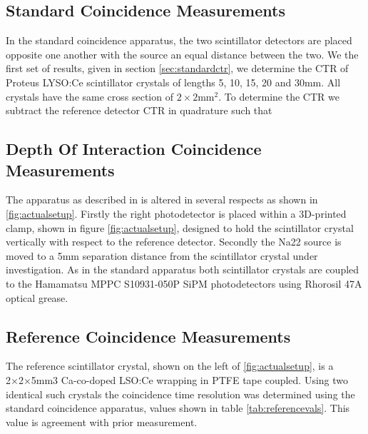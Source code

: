 \subsection{Standard Coincidence Measurements}
In the standard coincidence apparatus, the two scintillator detectors are placed opposite one another with the source an equal distance between the two. We the first set of results, given in section \ref{sec:standardctr}, we determine the CTR of Proteus LYSO:Ce scintillator crystals of lengths 5, 10, 15, 20 and 30mm. All crystals have the same cross section of $2\times2$mm$^2$. To determine the CTR we subtract the reference detector CTR in quadrature such that



\subsection{Depth Of Interaction Coincidence Measurements}
The apparatus as described in \cite{arron_Meyer_Pauwels_Lecoq_2012} is altered in several respects as shown in \ref{fig:actualsetup}. Firstly the right photodetector is placed within a 3D-printed clamp, shown in figure \ref{fig:actualsetup}, designed to hold the scintillator crystal vertically with respect to the reference detector. Secondly the Na22 source is moved to a 5mm separation distance from the scintillator crystal under investigation. As in the standard apparatus both scintillator crystals are coupled to the Hamamatsu MPPC S10931-050P SiPM photodetectors using Rhorosil 47A optical grease. 

\subsection{Reference Coincidence Measurements}
The reference scintillator crystal, shown on the left of \ref{fig:actualsetup}, is a 2×2×5mm3 Ca-co-doped LSO:Ce wrapping in PTFE tape coupled. Using two identical such crystals the coincidence time resolution was determined using the standard coincidence apparatus, values shown in table \ref{tab:referencevals}. This value is agreement with prior measurement\cite{arron_Meyer_Pauwels_Lecoq_2012}.